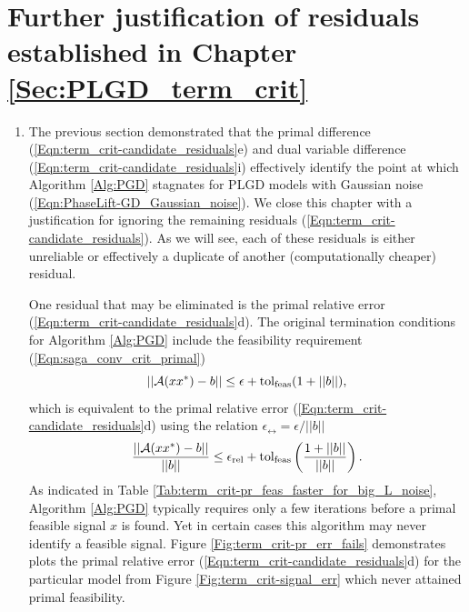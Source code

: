 \chapter{Further justification of residuals established in Chapter \ref{Sec:PLGD_term_crit}}      		\label{Sec:Appx-further_reasons_for_new_term_crit}


\begin{enumerate}



\item

The previous section demonstrated that the primal difference (\ref{Eqn:term_crit-candidate_residuals}e) and dual variable difference (\ref{Eqn:term_crit-candidate_residuals}i) effectively identify the point at which Algorithm \ref{Alg:PGD} stagnates for PLGD models with Gaussian noise (\ref{Eqn:PhaseLift-GD_Gaussian_noise}).  We close this chapter with a justification for ignoring the remaining residuals (\ref{Eqn:term_crit-candidate_residuals}).  As we will see, each of these residuals is either unreliable or effectively a duplicate of another (computationally cheaper) residual.  

One residual that may be eliminated is the primal relative error (\ref{Eqn:term_crit-candidate_residuals}d).  The original termination conditions for Algorithm \ref{Alg:PGD} include the feasibility requirement (\ref{Eqn:saga_conv_crit_primal}) 
\begin{equation*}
|| {\mathcal A}(xx^*) - b || \leq \epsilon + \textnormal{tol}_\textnormal{feas} (1 + ||b||),
\end{equation*}
which is equivalent to the primal relative error (\ref{Eqn:term_crit-candidate_residuals}d) using the relation $\epsilon_\rel = \epsilon / ||b||$
\begin{equation}
	\label{Eqn:GD_new_termination_conds-primal_feas}
\frac{||{\mathcal A}(xx^*) - b||}{||b||}  \leq \epsilon_{\textnormal{rel}} + \textnormal{tol}_\textnormal{feas} \left(\frac{1 + ||b||}{||b||}\right).
\end{equation}
As indicated in Table \ref{Tab:term_crit-pr_feas_faster_for_big_L_noise}, Algorithm \ref{Alg:PGD} typically requires only a few iterations before a primal feasible signal $x$ is found.  Yet in certain cases this algorithm may never identify a feasible signal.  Figure \ref{Fig:term_crit-pr_err_fails} demonstrates plots the primal relative error (\ref{Eqn:term_crit-candidate_residuals}d) for the particular model from Figure \ref{Fig:term_crit-signal_err} which never attained primal feasibility.


\end{enumerate}
